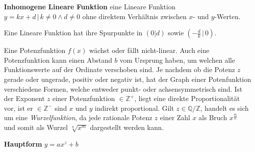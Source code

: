 \textbf{Inhomogene Lineare Funktion}  eine Lineare Funktion $y = kx + d \,|\, k \neq 0 \land d \neq 0$ ohne direktem Verh\"{a}ltnis zwischen $x$- und $y$-Werten.

Eine Lineare Funktion hat ihre Spurpunkte in $(0|d)$ sowie $\left(-\frac{d}{k} \, | \, 0\right)$.

\begin{figure}[h!]
\centering
\end{figure}


\pagebreak


Eine Potenzfunktion $f(x)$ w\"{a}chst oder f\"{a}llt nicht-linear. Auch eine Potenzfunktion kann einen Abstand $b$ vom Ursprung haben, um welchen alle Funktionswerte auf der Ordinate verschoben sind. Je nachdem ob die Potenz $z$ gerade oder ungerade, positiv oder negativ ist, hat der Graph einer Potenfunktion verschiedene Formen, welche entweder punkt- oder achsensymmetrisch sind. Ist der Exponent $z$ einer Potenzfunktion $\in \mathbb{Z^+}$, liegt eine direkte Proportionalit\"{a}t vor, ist er $\in \mathbb{Z^-}$ sind $x$ und $y$ indirekt proportional. Gilt $z \in \mathbb{Q} / \mathbb{Z}$, handelt es sich um eine \emph{Wurzelfunktion}, da jede rationale Potenz $z$ einer Zahl $x$ als Bruch $x^{\frac{m}{n}}$ und somit als Wurzel $\sqrt[n]{x^m}$ dargestellt werden kann.

\textbf{Hauptform}  $y = ax^z + b$

\extrapar

